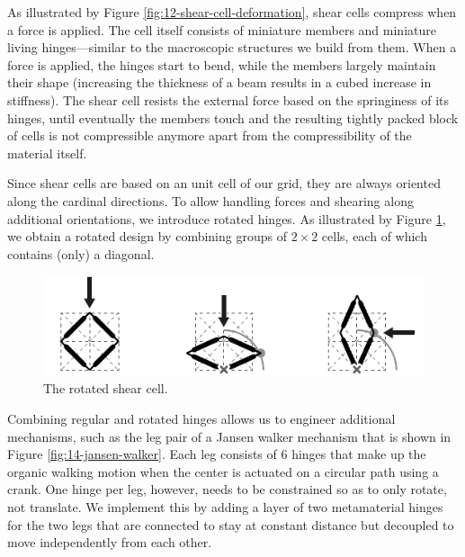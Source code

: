 As illustrated by Figure \ref{fig:12-shear-cell-deformation}, shear cells compress when a force is applied. The cell itself consists of miniature members and miniature living hinges---similar to the macroscopic structures we build from them. When a force is applied, the hinges start to bend, while the members largely maintain their shape (increasing the thickness of a beam results in a cubed increase in stiffness). The shear cell resists the external force based on the springiness of its hinges, until eventually the members touch and the resulting tightly packed block of cells is not compressible anymore apart from the compressibility of the material itself.

Since shear cells are based on an unit cell of our grid, they are always oriented along the cardinal directions. To allow handling forces and shearing along additional orientations, we introduce rotated hinges. As illustrated by Figure \ref{fig:13-diamond-cell-deformation}, we obtain a rotated design by combining groups of $2 \times 2$ cells, each of which contains (only) a diagonal. 

\begin{figure} [h]  
    \includegraphics[width=\textwidth]{chapters/metamaterial-mechanisms-FIG/13-diamond-cell-deformation.pdf}
    \caption[Short figure name.]{The rotated shear cell.
    \label{fig:13-diamond-cell-deformation}}
\end{figure}

Combining regular and rotated hinges allows us to engineer additional mechanisms, such as the leg pair of a Jansen walker mechanism that is shown in Figure \ref{fig:14-jansen-walker}. Each leg consists of 6 hinges that make up the organic walking motion when the center is actuated on a circular path using a crank. One hinge per leg, however, needs to be constrained so as to only rotate, not translate. We implement this by adding a layer of two metamaterial hinges for the two legs that are connected to stay at constant distance but decoupled to move independently from each other. 

